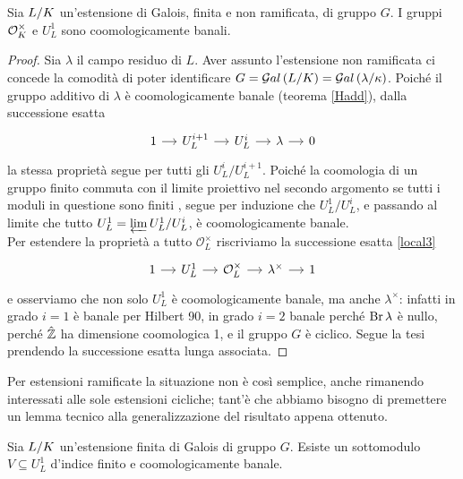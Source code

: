 \begin{theorem}
	Sia $ L/K $ un'estensione di Galois, finita e non ramificata, di gruppo $ G $. I gruppi $ \mathcal{O}_{K}^\times $ e $ U_L^1 $ sono coomologicamente banali.
\end{theorem}
\begin{proof}
	Sia $ \lambda $ il campo residuo di $ L $. Aver assunto l'estensione non ramificata ci concede la comodità di poter identificare $ G = \mathcal{G}al\left( L/K \right) = \mathcal{G}al\left( \lambda / \kappa \right) $. Poiché il gruppo additivo di $ \lambda $ è coomologicamente banale (teorema \ref{Hadd}), dalla successione esatta
	\[\begin{tikzcd}[column sep = small]
	1 \rar
	& U_L^{i+1} \rar
	& U_{L}^i \rar
	& \lambda \rar
	& 0
	\end{tikzcd}\]
	la stessa proprietà segue per tutti gli $ U^i_{L} / U^{i+1}_{L} $.
	Poiché la coomologia di un gruppo finito commuta con il limite proiettivo nel secondo argomento se tutti i moduli in questione sono finiti \cite[proposizione 1.12]{Harari}, segue per induzione che $ U^1_{L} / U^{i}_{L} $, e passando al limite che tutto $ U^1_L = \varprojlim U^1_{L} / U^{i}_{L} $, è coomologicamente banale. \\
	
	Per estendere la proprietà a tutto $ \mathcal{O}_{L}^\times $ riscriviamo la successione esatta \eqref{local3}
	\begin{equation*}
	\begin{tikzcd}[column sep = small]
	1 \rar
	& U_L^{1} \rar
	& \mathcal{O}_{L}^\times \rar
	& \lambda^\times \rar
	&1
	\end{tikzcd}
	\end{equation*}
	e osserviamo che non solo $  U^1_L $ è coomologicamente banale, ma anche $ \lambda^\times $: infatti in grado $ i = 1 $ è banale per Hilbert 90, in grado $ i = 2 $ banale perché $ \operatorname{Br} \lambda $ è nullo, perché $ \hat{\mathbb{Z}} $ ha dimensione coomologica 1, e il gruppo $ G $ è ciclico. Segue la tesi prendendo la successione esatta lunga associata.
\end{proof}

Per estensioni ramificate la situazione non è così semplice, anche rimanendo interessati alle sole estensioni cicliche; tant'è che abbiamo bisogno di premettere un lemma tecnico alla generalizzazione del risultato appena ottenuto.

\begin{lemma}
	Sia $ L/K $ un'estensione finita di Galois di gruppo $ G $. Esiste un sottomodulo $ V \subseteq U_L^1 $ d'indice finito e coomologicamente banale.
\end{lemma}

